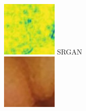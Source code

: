 \documentclass[conference]{IEEEtran}
\begin{document}
\begin{figure}[!t]
         \\
        \vfill
        \includegraphics[width=\linewidth]{Figures/983/983_SRGAN__ssim.jpg}
        SRGAN \\
    \endminipage\hfill
        \centering
        \includegraphics[width=\linewidth]{Figures/983/983_cycleGAN.jpg}

\end{figure}
\end{document}
